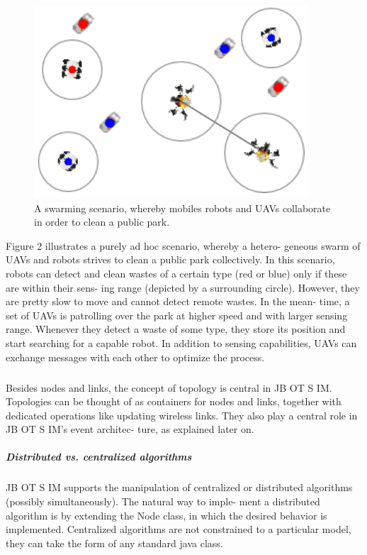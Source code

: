 \begin{figure}[h!]
	\centering
	\includegraphics[width=0.7\linewidth]{fig_3}
	\caption[A swarming scenario, whereby mobiles robots and UAVs collaborate in order to clean a public park.]{A swarming scenario, whereby mobiles robots and UAVs collaborate in order to clean a public park.}
	\label{fig:fig3}
\end{figure}
Figure 2 illustrates a purely ad hoc scenario, whereby a hetero- geneous swarm of UAVs and robots strives to clean a public park collectively. In this scenario, robots can detect and clean wastes of a certain type (red or blue) only if these are within their sens- ing range (depicted by a surrounding circle). However, they are pretty slow to move and cannot detect remote wastes. In the mean- time, a set of UAVs is patrolling over the park at higher speed and with larger sensing range. Whenever they detect a waste of some type, they store its position and start searching for a capable robot. In addition to sensing capabilities, UAVs can exchange messages with each other to optimize the process.
\subparagraph{}Besides nodes and links, the concept of topology is central in JB OT S IM. Topologies can be thought of as containers for nodes and links, together with dedicated operations like updating wireless links. They also play a central role in JB OT S IM’s event architec- ture, as explained later on.
\subparagraph{Distributed vs. centralized algorithms}
\subparagraph{}JB OT S IM supports the manipulation of centralized or distributed algorithms (possibly simultaneously). The natural way to imple- ment a distributed algorithm is by extending the Node class, in which the desired behavior is implemented. Centralized algorithms are not constrained to a particular model, they can take the form of any standard java class.

